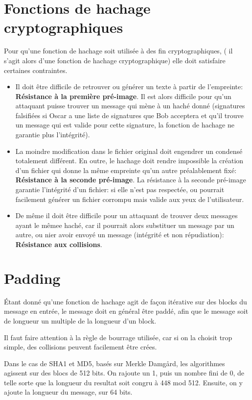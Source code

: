 \documentclass[10.5pt, a4paper, twoside, openright]{report}
\begin{document}
\section{Fonctions de hachage cryptographiques} 
Pour qu’une fonction de hachage soit utilisée à des fin cryptographiques, ( il s’agit alors d’une fonction de hachage cryptographique) elle doit satisfaire certaines contraintes.
\begin{itemize}
\item{Il doit être difficile de retrouver ou générer un texte à partir de l’empreinte: \textbf{Résistance à la première pré-image}.
Il est alors difficile pour qu’un attaquant puisse trouver un message qui mène à un haché donné 	(signatures falsifiées si Oscar a une liste de signatures que Bob acceptera et qu’il trouve un message qui est valide pour cette signature, la fonction de hachage ne garantie plus l’intégrité).}
\item{La moindre modification dans le fichier original doit engendrer un condensé totalement différent. En outre, le hachage doit rendre impossible la création d’un fichier qui donne la même empreinte qu’un autre préalablement fixé: \textbf{Résistance à la seconde pré-image}. 
La résistance à la seconde pré-image garantie l’intégrité d’un fichier: si elle n’est pas respectée, ou pourrait facilement générer un fichier corrompu mais valide aux yeux de l’utilisateur.}
\item{De même il doit être difficile pour un attaquant de trouver deux messages ayant le mêmee haché, car il pourrait alors substituer un message par un autre, ou nier avoir envoyé un message (intégrité et non répudiation): \textbf{Résistance aux collisions}.}
\end{itemize}

\section{Padding}
Étant donné qu'une fonction de hachage agit de façon itérative sur des blocks du message en entrée, le message doit en général être paddé, afin que le message soit de longueur un multiple de la longueur d'un block.

Il faut faire attention à la règle de bourrage utilisée, car si on la choisit trop simple, des collisions peuvent facilement être crées.

Dans le cas de SHA1 et MD5, basés sur Merkle Damg\r{a}rd, les algorithmes agissent sur des blocs de 512 bits. On rajoute un 1, puis un nombre fini de 0, de telle sorte que la longueur du resultat soit congru à 448 mod 512. Ensuite, on y ajoute la longueur du message, sur 64 bits.
\end{document}

